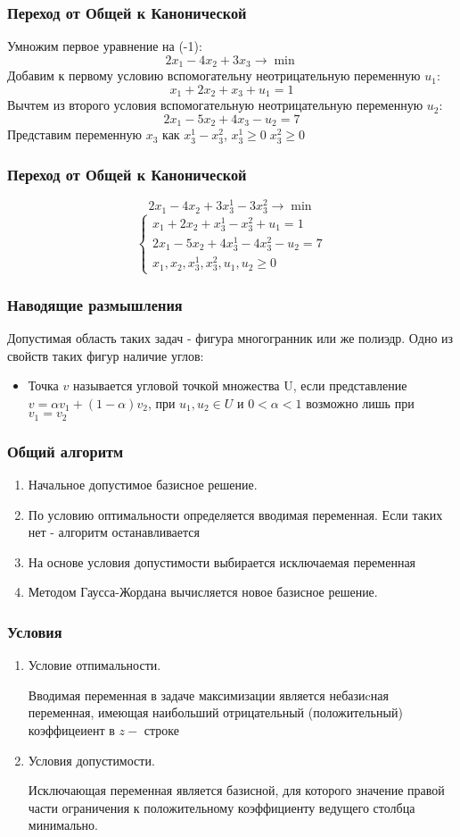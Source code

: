 \documentclass[12pt]{beamer}
\begin{document}
\begin{frame}
\frametitle{Переход от Общей к Канонической}

Умножим первое уравнение на (-1):
\[2x_1-4x_2+3x_3 \to \min\]
Добавим к первому условию вспомогательну неотрицательную переменную $u_1$:
\[x_1+2x_2+x_3+u_1= 1\]
Вычтем из второго условия вспомогательную неотрицательную переменную $u_2$:
\[2x_1-5x_2+4x_3-u_2= 7\]
Представим переменную $x_3$ как $x_3^1-x_3^2$, $x_3^1\geq 0 \;x_3^2\geq 0$
\end{frame}
\begin{frame}
	\frametitle{Переход от Общей к Канонической}
\[2x_1-4x_2+3x_3^1-3x_3^2 \to \min\]
\begin{equation*}
	\begin{cases}	
		x_1+2x_2+x_3^1-x_3^2+u_1= 1\\
		2x_1-5x_2+4x_3^1-4x_3^2-u_2= 7\\
		x_1,x_2,x_3^1,x_3^2,u_1,u_2\geq0
	\end{cases}
\end{equation*}
\end{frame}

\begin{frame}
	\frametitle{Наводящие размышления}
	Допустимая область таких задач - фигура многогранник или же полиэдр. Одно из свойств таких фигур наличие углов:
	\begin{itemize}
		\item Точка $v$ называется угловой точкой множества U, если представление $v=\alpha v_1+(1-\alpha)v_2$, при $u_1, u_2\in U$ и $0<\alpha <1$ возможно лишь при $v_1=v_2$
	\end{itemize}
\end{frame}

\begin{frame}
	\frametitle{Общий алгоритм}
\begin{enumerate}
	\item Начальное допустимое базисное решение.
	\item По условию оптимальности определяется вводимая переменная. Если таких нет - алгоритм останавливается
	\item На основе условия допустимости выбирается исключаемая переменная
	\item Методом Гаусса-Жордана вычисляется новое базисное решение.
\end{enumerate}
\end{frame}
\begin{frame}
	\frametitle{Условия }
	\begin{enumerate}
		\item Условие отпимальности. 
		
		Вводимая переменная в задаче максимизации является небазиcная переменная, имеющая наибольший отрицательный (положительный) коэффицеиент в $z-$ строке
		\item Условия допустимости.
		
		Исключающая переменная является базисной, для которого значение правой части ограничения к положительному коэффициенту ведущего столбца минимально.
	\end{enumerate}
\end{frame}
\end{document}
